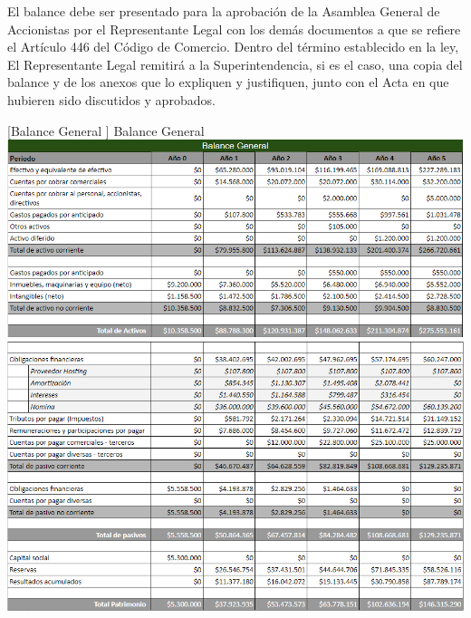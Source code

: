 El balance debe ser presentado para la aprobación de la Asamblea General de Accionistas por el Representante Legal con los demás documentos a que se refiere el Artículo 446 del Código de Comercio. Dentro del término establecido en la ley, El Representante Legal remitirá a la Superintendencia, si es el caso, una copia del balance y de los anexos que lo expliquen y justifiquen, junto con el Acta en que hubieren sido discutidos y aprobados.


\vspace{4mm}
\begin{minipage}{0.9\textwidth}
\centering
{}[{Balance General }]{ Balance General }
\label{balance}
\includegraphics[width=1.1\textwidth]{Images/balance1.png}
\includegraphics[width=1.1\textwidth]{Images/balance2.png}
\end{minipage}
\newpage
